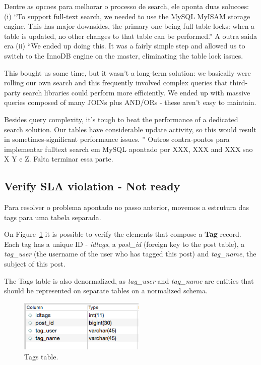 Dentre as opcoes para melhorar o processo de search, ele aponta duas solucoes: (i) ``To support full-text search, we needed to use the MySQL MyISAM storage engine. This has major downsides, the primary one being full table locks: when a table is updated, no other changes to that table can be performed.'' A outra saida era (ii) ``We ended up doing this. It was a fairly simple step and allowed us to switch to the InnoDB engine on the master, eliminating the table lock issues.

This bought us some time, but it wasn't a long-term solution: we basically were rolling our own search and this frequently involved complex queries that third-party search libraries could perform more efficiently. We ended up with massive queries composed of many JOINs plus AND/ORs - these aren't easy to maintain.

Besides query complexity, it's tough to beat the performance of a dedicated search solution. Our tables have considerable update activity, so this would result in sometimes-significant performance issues.
''
Outros contra-pontos para implementar fulltext search em MySQL apontado por XXX, XXX and XXX sao X Y e Z. Falta terminar essa parte.

\subsection{Verify SLA violation - Not ready}

Para resolver o problema apontado no passo anterior, movemos a estrutura das tags para uma tabela separada. 

On Figure~\ref{fig:tagTable} it is possible to verify the elements that compose a \textbf{Tag} record. Each tag has a unique ID - \textit{idtags}, a \textit{post\_id} (foreign key to the post table), a \textit{tag\_user} (the username of the user who has tagged this post) and \textit{tag\_name}, the subject of this post. 

The Tags table is also denormalized, as \textit{tag\_user} and \textit{tag\_name} are entities that should be represented on separate tables on a normalized schema.

\begin{figure}[ht!]
\centering
\includegraphics[width=60mm]{tagTable.png}
\caption{Tags table.\label{fig:tagTable}}
\end{figure}

